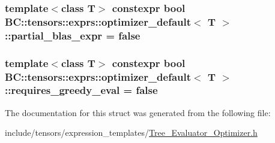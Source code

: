 \subsubsection[{\texorpdfstring{partial\+\_\+blas\+\_\+expr}{partial_blas_expr}}]{\setlength{\rightskip}{0pt plus 5cm}template$<$class T$>$ constexpr bool {\bf B\+C\+::tensors\+::exprs\+::optimizer\+\_\+default}$<$ T $>$\+::partial\+\_\+blas\+\_\+expr = false\hspace{0.3cm}{\ttfamily [static]}}\hypertarget{structBC_1_1tensors_1_1exprs_1_1optimizer__default_a31f56cf6b64b5a00392d18ebb17d8bf9}{}\label{structBC_1_1tensors_1_1exprs_1_1optimizer__default_a31f56cf6b64b5a00392d18ebb17d8bf9}
\subsubsection[{\texorpdfstring{requires\+\_\+greedy\+\_\+eval}{requires_greedy_eval}}]{\setlength{\rightskip}{0pt plus 5cm}template$<$class T$>$ constexpr bool {\bf B\+C\+::tensors\+::exprs\+::optimizer\+\_\+default}$<$ T $>$\+::requires\+\_\+greedy\+\_\+eval = false\hspace{0.3cm}{\ttfamily [static]}}\hypertarget{structBC_1_1tensors_1_1exprs_1_1optimizer__default_a5c8310dce5595c496a7e396501ee7949}{}\label{structBC_1_1tensors_1_1exprs_1_1optimizer__default_a5c8310dce5595c496a7e396501ee7949}


The documentation for this struct was generated from the following file\+:\begin{DoxyCompactItemize}
\item 
include/tensors/expression\+\_\+templates/\hyperlink{Tree__Evaluator__Optimizer_8h}{Tree\+\_\+\+Evaluator\+\_\+\+Optimizer.\+h}\end{DoxyCompactItemize}
